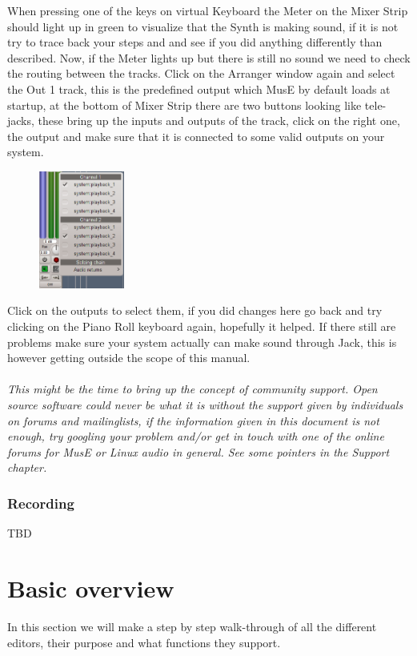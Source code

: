 \documentclass[a4paper]{report}
\begin{document}
When pressing one of the keys on virtual Keyboard the Meter on the Mixer
Strip should light up in green to visualize that the Synth is making
sound, if it is not try to trace back your steps and and see if you did
anything differently than described.
Now, if the Meter lights up but there is still no sound we need to
check the routing between the tracks. Click on the Arranger window again
and select the Out 1 track, this is the predefined output which MusE by
default loads at startup, at the bottom of Mixer Strip there are two
buttons looking like tele- jacks, these bring up the inputs and outputs
of the track, click on the right one, the output and make sure that it is
connected to some valid outputs on your system.
\begin{figure}
\includegraphics[width=0.25\textwidth]{pics/output_routing} 
\end{figure}
Click on the outputs to select them, if you did changes here go back and
try clicking on the Piano Roll keyboard again, hopefully it helped. If there
still are problems make sure your system actually can make sound through
Jack, this is however getting outside the scope of this manual.\\\\
\textit{This might be the time to bring up the concept of community support.
Open source software could never be what it is without the support given by
individuals on forums and mailinglists, if the information given in this
document is not enough, try googling your problem and/or get in touch with
one of the online forums for MusE or Linux audio in general. See some pointers
in the Support chapter.}

\subsubsection{Recording}                                                %
TBD


\section{Basic overview}
In this section we will make a step by step walk-through of all the
different editors, their purpose and what functions they support.
\end{document}
